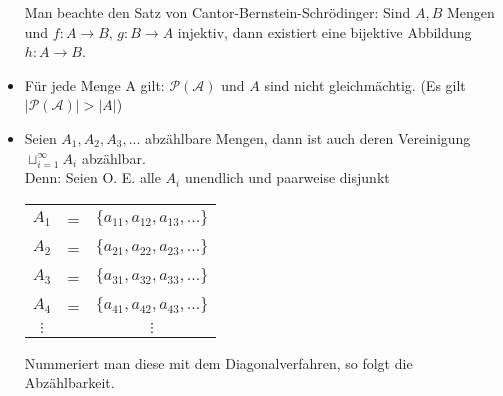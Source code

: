 \begin{itemize}[noitemsep]
Man beachte den Satz von Cantor-Bernstein-Schrödinger: Sind $A,B$ Mengen und $f\colon A \to B, \, g\colon B\to A$ injektiv, dann existiert eine bijektive Abbildung $h\colon A \to B$.
\item Für jede Menge A gilt: $\mathcal{P(A)}$ und $A$ sind nicht gleichmächtig. (Es gilt $|\mathcal{P(A)}| > |A|$)
\item Seien $A_1, A_2, A_3, ...$ abzählbare Mengen, dann ist auch deren Vereinigung $\sqcup_{i=1}^\infty A_i$ abzählbar.\\
Denn: Seien O. E. alle $A_i$ unendlich und paarweise disjunkt\\

\parbox{0.4\textwidth}{
	\begin{tabulary}{\textwidth}{c c c}
		$A_1$ & = & $\{a_{11}, a_{12}, a_{13}, ...\}$\\
		$A_2$ & = & $\{a_{21}, a_{22}, a_{23}, ...\}$\\
		$A_3$ & = & $\{a_{31}, a_{32}, a_{33}, ...\}$\\
		$A_4$ & = & $\{a_{41}, a_{42}, a_{43}, ...\}$\\
		$\vdots$ & & $\vdots$
	\end{tabulary}}
\parbox{0.6\textwidth}{
	Nummeriert man diese mit dem Diagonalverfahren, so folgt die Abzählbarkeit.\vspace{45pt}}
\end{itemize}